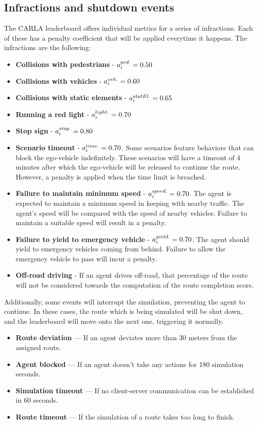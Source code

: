 \documentclass{article}
\begin{document}
\subsection{Infractions and shutdown events}
The CARLA leaderboard offers individual metrics for a series of infractions. Each of these has a penalty coefficient that will be applied everytime it happens.
The infractions are the following:
\begin{itemize}
    \item \textbf{Collisions with pedestrians} - $a_{\small{i}}^{\small{ped.}} = 0.50$
    \item \textbf{Collisions with vehicles} - $a_{\small{i}}^{\small{veh.}} = 0.60$
    \item \textbf{Collisions with static elements} - $a_{\small{i}}^{\small{statEl.}} = 0.65$
    \item \textbf{Running a red light } - $a_{\small{i}}^{\small{light.}} = 0.70$
    \item \textbf{Stop sign} - $a_{\small{i}}^{\small{stop.}} = 0.80$
    \item \textbf{Scenario timeout} - $a_{\small{i}}^{\small{time.}} = 0.70$. Some scenarios feature behaviors that can block the ego-vehicle indefinitely.
            These scenarios will have a timeout of 4 minutes after which the ego-vehicle will be released to continue the route. However, a penalty is applied when
            the time limit is breached.
    \item \textbf{Failure to maintain minimum speed} - $a_{\small{i}}^{\small{speed.}} = 0.70$. The agent is expected to maintain a minimum speed in keeping with nearby traffic.
            The agent’s speed will be compared with the speed of nearby vehicles. Failure to maintain a suitable speed will result in a penalty.
    \item \textbf{Failure to yield to emergency vehicle} - $a_{\small{i}}^{\small{yield.}} = 0.70$. The agent should yield to emergency vehicles coming from behind. Failure to allow the emergency vehicle to pass will incur a penalty.
    \item \textbf{Off-road driving} - If an agent drives off-road, that percentage of the route will not be considered towards the computation of the route completion score.
\end{itemize}

Additionally, some events will interrupt the simulation, preventing the agent to continue. In these cases, the route which is being simulated will be shut down, and the
leaderboard will move onto the next one, triggering it normally.
\begin{itemize}
    \item \textbf{Route deviation} — If an agent deviates more than 30 meters from the assigned route.
    \item \textbf{Agent blocked} — If an agent doesn’t take any actions for 180 simulation seconds.
    \item \textbf{Simulation timeout} — If no client-server communication can be established in 60 seconds.
    \item \textbf{Route timeout} — If the simulation of a route takes too long to finish.
\end{itemize}
\end{document}
